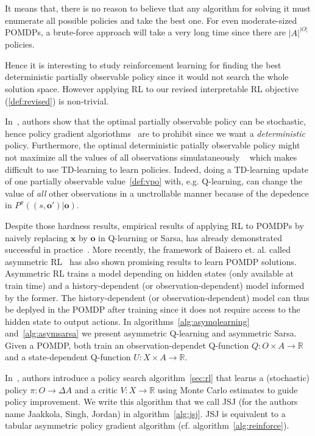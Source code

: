 It means that, there is no reason to believe that any algorithm for solving it must enumerate all possible policies and take the best one. 
For even moderate-sized POMDPs, a brute-force approach will take a very long time since there are $|A|^{|O|}$ policies.

Hence it is interesting to study reinforcement learning for finding the best deterministic partially observable policy since it would not search the whole solution space.
However applying RL to our revised interpretable RL objective (\ref{def:revised}) is non-trivial.

In~\cite[Fact 2]{learning-pomdp}, authors show that the optimal partially observable policy can be stochastic, hence policy gradient algoriothms~\cite{pg_sutton} are to prohibit since we want a \textit{deterministic} policy. 
Furthermore, the optimal deterministic patially observable policy might not maximize all the values of all observations simulataneously ~\cite[Fact 5]{learning-pomdp} which makes difficult to use TD-learning to learn policies.
Indeed, doing a TD-learning update of one partially observable value~\ref{def:vpo} with, e.g. Q-learning, can change the value of \textit{all} other observations in a unctrollable manner because of the depedence in $P^{\pi}((s, \boldsymbol{o}')|\boldsymbol{o})$.

Despite those hardness results, empirical results of applying RL to POMDPs by naively replacing $\boldsymbol{x}$ by $\boldsymbol{o}$ in Q-learning or Sarsa, has already demonstrated successful in practice~\cite{sarsa-pomdp}. 
More recently, the framework of Baisero et. al. called asymmetric RL~\cite{baisero-dqn,baisero-ppo} has also shown promising results to learn POMDP solutions.
Asymmetric RL trains a model depending on hidden states (only available at train time) and a history-dependent (or observation-dependent) model informed by the former.
The history-dependent (or observation-dependent) model can thus be deplyed in the POMDP after training since it does not require access to the hidden state to output actions.
In algorithms~\ref{alg:asymqlearning} and~\ref{alg:asymsarsa} we present asymmetric Q-learning and asymmetric Sarsa. Given a POMDP, both train an observation-dependet Q-function $Q:O\times A\rightarrow\mathbb{R}$ and a state-dependent Q-function $U:X\times A\rightarrow\mathbb{R}$.

In~\cite{jsj}, authors introduce a policy search algorithm~\ref{sec:rl} that learns a (stochastic) policy $\pi:O\rightarrow\Delta A$ and a critic $V:X\rightarrow \mathbb{R}$ using Monte Carlo estimates to guide policy improvement.
We write this algorithm that we call JSJ (for the authors name Jaakkola, Singh, Jordan) in algorithm~\ref{alg:jsj}. JSJ is equivalent to a tabular asymmetric policy gradient algorithm (cf. algorithm~\ref{alg:reinforce}). 

